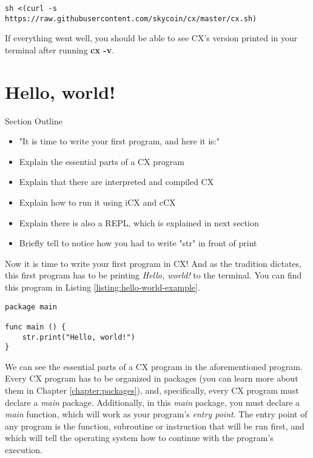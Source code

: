 \documentclass[11pt,fleqn,openany]{book} %
\begin{document}
\begin{lstlisting}[caption={One-liner CX Installation Script for *nix Systems},captionpos=b,label={listing:cx-installation-one-liner}]
sh <(curl -s https://raw.githubusercontent.com/skycoin/cx/master/cx.sh)
\end{lstlisting}

If everything went well, you should be able to see CX's version printed in your terminal after running \textbf{cx -v}.

\section{Hello, world!}

\begin{remark}
Section Outline
    \begin{itemize}
    	\item "It is time to write your first program, and here it is:"
        \item Explain the essential parts of a CX program
        \item Explain that there are interpreted and compiled CX
        \item Explain how to run it using iCX and cCX
        \item Explain there is also a REPL, which is explained in next section
        \item Briefly tell to notice how you had to write "str" in front of print
    \end{itemize}
\end{remark}

Now it is time to write your first program in CX! And as the tradition dictates, this first program has to be printing \emph{Hello, world!} to the terminal. You can find this program in Listing \ref{listing:hello-world-example}.

\begin{lstlisting}[caption={"Hello, world!" Example},captionpos=b,label={listing:hello-world-example}]
package main

func main () {
 	str.print("Hello, world!")
}
\end{lstlisting}

We can see the essential parts of a CX program in the aforementioned program. Every CX program has to be organized in packages (you can learn more about them in Chapter \ref{chapter:packages}), and, specifically, every CX program must declare a \emph{main} package. Additionally, in this \emph{main} package, you must declare a \emph{main} function, which will work as your program's \emph{entry point}. The entry point of any program is the function, subroutine or instruction that will be run first, and which will tell the operating system how to continue with the program's execution.
\end{document}
